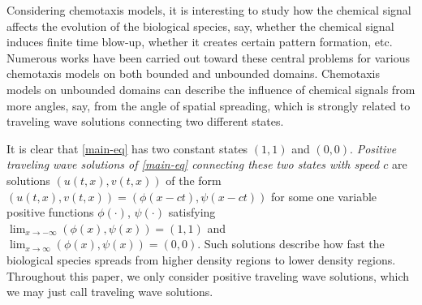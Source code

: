 \documentclass[11pt]{article} %
\theoremstyle{remark}
\theoremstyle{remark}
\numberwithin{equation}{section}
\numberwithin{figure}{section}
\numberwithin{table}{section}
\begin{document}
Considering chemotaxis models, it is interesting to study how the chemical signal affects the evolution of the biological species, say, whether  the chemical signal  induces finite time blow-up, whether it creates certain pattern formation, etc. Numerous works have been carried out toward these central problems for various
chemotaxis models on both bounded  and unbounded domains.  Chemotaxis models on unbounded domains can 
describe the influence of chemical signals from more angles, say, from the angle of spatial spreading, which is strongly related to traveling wave solutions connecting two different states. 


It is clear that \eqref{main-eq} has two constant states $(1,1)$ and $(0,0)$. {\it Positive traveling wave solutions of \eqref{main-eq} connecting these two states  with speed $c$}  are  solutions $(u(t,x),v(t,x))$
of the form $(u(t,x),v(t,x))=(\phi(x-ct),\psi(x-ct))$ for some one variable positive  functions $\phi(\cdot)$, $\psi(\cdot)$ satisfying $\lim_{x\to -\infty}(\phi(x),\psi(x))=(1,1)$ and $\lim_{x\to\infty}(\phi(x),\psi(x))=(0,0)$.
Such solutions  describe how fast the biological species spreads from higher density regions to lower density regions. Throughout this paper, we only consider positive traveling wave solutions, which we may just call traveling wave solutions.
\end{document}
